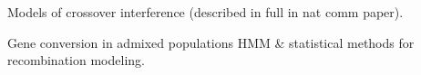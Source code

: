 \begin{titemize}
    \item Models of crossover interference (described in full in nat comm paper).
    \item Gene conversion in admixed populations HMM \& statistical methods for recombination modeling.
\end{titemize}






